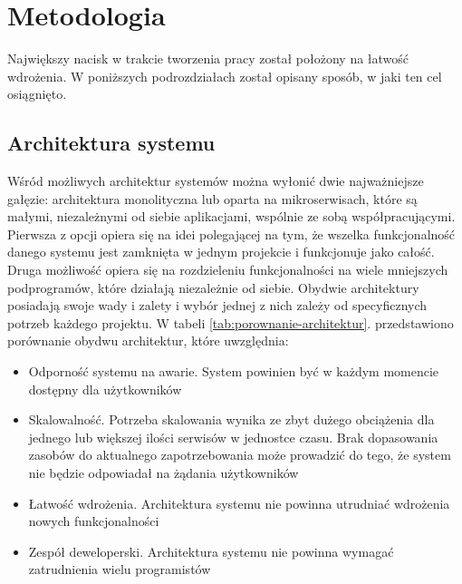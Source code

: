\clearpage
\section{Metodologia}

Największy nacisk w trakcie tworzenia pracy został położony na łatwość wdrożenia. 
W poniższych podrozdziałach został opisany sposób, w jaki ten cel osiągnięto.

\subsection{Architektura systemu}

Wśród możliwych architektur systemów można wyłonić dwie najważniejsze gałęzie: 
architektura monolityczna lub oparta na mikroserwisach, które są małymi, niezależnymi 
od siebie aplikacjami, wspólnie ze sobą współpracującymi. Pierwsza z opcji opiera się 
na idei polegającej na tym, że wszelka funkcjonalność danego systemu jest zamknięta 
w jednym projekcie i funkcjonuje jako całość. Druga możliwość opiera się na 
rozdzieleniu funkcjonalności na wiele mniejszych podprogramów, które działają 
niezależnie od siebie. Obydwie architektury posiadają swoje wady i zalety i wybór 
jednej z nich zależy od specyficznych potrzeb każdego projektu. W tabeli 
\ref{tab:porownanie-architektur}. przedstawiono porównanie obydwu architektur, które 
uwzględnia:

\begin{itemize} %
    \item Odporność systemu na awarie. System powinien być w każdym momencie dostępny 
    dla użytkowników
    \item Skalowalność. Potrzeba skalowania wynika ze zbyt dużego obciążenia dla jednego 
    lub większej ilości serwisów w jednostce czasu. Brak dopasowania zasobów do 
    aktualnego zapotrzebowania może prowadzić do tego, że system nie będzie odpowiadał 
    na żądania użytkowników
    \item Łatwość wdrożenia. Architektura systemu nie powinna utrudniać wdrożenia nowych 
    funkcjonalności
    \item Zespół deweloperski. Architektura systemu nie powinna wymagać zatrudnienia 
    wielu programistów
\end{itemize}

